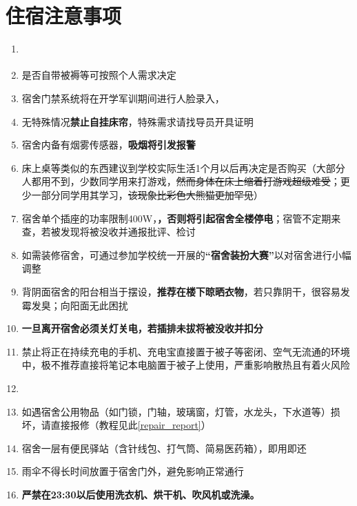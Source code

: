 \section[住宿注意事项]{住宿注意事项}
\begin{enumerate}
      \item \textbf{}
            \label{random_allocation}
      \item 是否自带被褥等可按照个人需求决定\footnotemark
      \item 宿舍门禁系统将在开学军训期间进行人脸录入，\textbf{}
      \item 无特殊情况\textbf{禁止自挂床帘}，特殊需求请找导员开具证明
      \item 宿舍内备有烟雾传感器，\textbf{吸烟将引发报警\footnotemark}
      \item 床上桌等类似的东西建议到学校实际生活1个月以后再决定是否购买（大部分人都用不到，少数同学用来打游戏，\sout{然而身体在床上缩着打游戏超级难受}；更少一部分同学用其学习，\sout{该现象\linebreak[3]比彩色大熊猫更加罕见}）
      \item 宿舍单个插座的功率限制400W\footnotemark，\textbf{}\linebreak[3]\textbf{，否则将引起宿舍全楼停电}；宿管不定期来查，若被发现将被没收并通报批评、检讨
      \item 如需装修宿舍，可通过参加学校统一开展的\textbf{“宿舍装扮大赛”}\footnotemark 以对宿舍进行小幅调整
      \item 背阴面宿舍的阳台相当于摆设，\textbf{推荐在楼下晾晒衣物}，若只靠阴干，很容易发霉发臭；向阳面无此困扰
      \item \textbf{一旦离开宿舍必须关灯关电，若插排未拔将被没收并扣分}
      \item 禁止将正在持续充电的手机、充电宝直接置于被子等密闭、空气无流通的环境中，极不推荐直接将笔记本电脑置于被子上使用，严重影响散热且有着火风险
      \item \textbf{}\footnotemark
      \item 如遇宿舍公用物品（如门锁，门轴，玻璃窗，灯管，水龙头，下水道等）损坏，请直接报修（教程见此\uline{\ref{repair_report}}）
      \item 宿舍一层有便民驿站（含针线包、打气筒、简易医药箱），即用即还
      \item 雨伞不得长时间放置于宿舍门外，避免影响正常通行
      \item \textbf{严禁在23:30以后使用洗衣机、烘干机、吹风机或洗澡。}
\end{enumerate}

